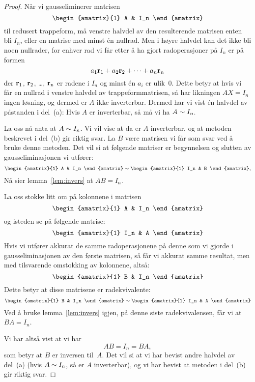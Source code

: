 \begin{proof}
Når vi gausseliminerer matrisen
\[
\begin{amatrix}{1} A & I_n \end{amatrix}
\]
til redusert trappeform, må venstre halvdel av den resulterende
matrisen enten bli $I_n$, eller en matrise med minst én nullrad.  Men
i høyre halvdel kan det ikke bli noen nullrader, for enhver rad vi får
etter å ha gjort radoperasjoner på $I_n$ er på formen
\[
a_1 \mathbf{r}_1 + a_2 \mathbf{r}_2 + \cdots + a_n \mathbf{r}_n
\]
der $\mathbf{r}_1$, $\mathbf{r}_2$, \ldots, $\mathbf{r}_n$ er radene i $I_n$ og minst
én $a_i$ er ulik~$0$.  Dette betyr at hvis vi får en nullrad i venstre
halvdel av trappeformmatrisen, så har likningen $AX = I_n$ ingen
løsning, og dermed er $A$ ikke inverterbar.  Dermed har vi vist én
halvdel av påstanden i del~(a): Hvis $A$ er inverterbar, så må vi ha
$A \sim I_n$.

La oss nå anta at $A \sim I_n$.  Vi vil vise at da er $A$
inverterbar, og at metoden beskrevet i del~(b) gir riktig svar.  La
$B$ være matrisen vi får som svar ved å bruke denne metoden.  Det vil
si at følgende matriser er begynnelsen og slutten av
gausseliminasjonen vi utfører:
\[
\begin{amatrix}{1} A & I_n \end{amatrix}
\roweq
\begin{amatrix}{1} I_n & B \end{amatrix},
\]
Nå sier lemma~\ref{lem:invers} at $AB = I_n$.

La oss stokke litt om på kolonnene i matrisen
\[
\begin{amatrix}{1} A & I_n \end{amatrix}
\]
og isteden se på følgende matrise:
\[
\begin{amatrix}{1} I_n & A \end{amatrix}
\]
Hvis vi utfører akkurat de samme radoperasjonene på denne som vi
gjorde i gausseliminasjonen av den første matrisen, så får vi akkurat
samme resultat, men med tilsvarende omstokking av kolonnene, altså:
\[
\begin{amatrix}{1} B & I_n \end{amatrix}
\]
Dette betyr at disse matrisene er radekvivalente:
\[
\begin{amatrix}{1} B & I_n \end{amatrix}
\roweq
\begin{amatrix}{1} I_n & A \end{amatrix}
\]
Ved å bruke lemma~\ref{lem:invers} igjen, på denne siste
radekvivalensen, får vi at $BA = I_n$.

Vi har altså vist at vi har
\[
AB = I_n = BA,
\]
som betyr at $B$ er inversen til~$A$.  Det vil si at vi har bevist
andre halvdel av del~(a) (hvis $A \sim I_n$, så er $A$ inverterbar),
og vi har bevist at metoden i del~(b) gir riktig svar.
\end{proof}


